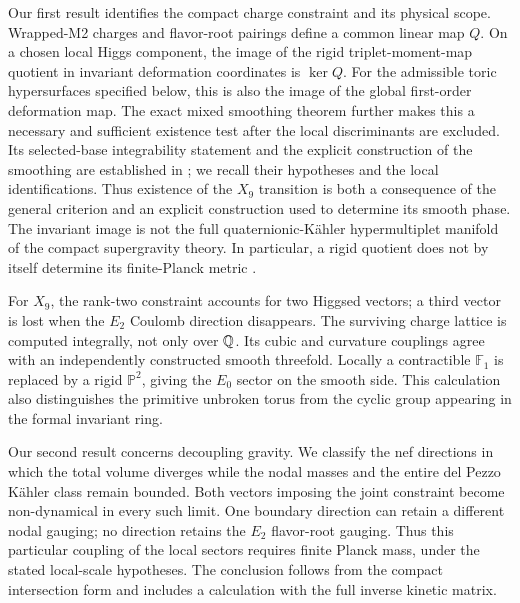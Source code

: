 Our first result identifies the compact charge constraint and
its physical scope. Wrapped-M2 charges and flavor-root
pairings define a common linear map $Q$. On a chosen local
Higgs component, the image of the rigid triplet-moment-map
quotient in invariant deformation coordinates is $\ker Q$.
For the admissible toric hypersurfaces specified below, this
is also the image of the global first-order deformation map.
The exact mixed smoothing theorem further makes this a necessary
and sufficient existence test after the local discriminants are
excluded. Its selected-base integrability statement and the
explicit construction of the smoothing are established in
\cite{Wuebben:2026smoothing}; we recall their hypotheses and the
local identifications. Thus existence of the $X_9$ transition is
both a consequence of the general criterion and an explicit
construction used to determine its smooth phase. The invariant image is not the full
quaternionic-K\"ahler hypermultiplet manifold of the compact
supergravity theory. In particular, a rigid quotient does not
by itself determine its finite-Planck metric
\cite{Mohaupt:2004de}.

For $X_9$, the rank-two constraint accounts for two Higgsed
vectors; a third vector is lost when the $E_2$ Coulomb
direction disappears. The surviving charge lattice is computed
integrally, not only over $\mathbb Q$. Its cubic and curvature
couplings agree with an independently constructed smooth
threefold. Locally a contractible $\mathbb F_1$ is replaced
by a rigid $\mathbb P^2$, giving the $E_0$ sector on the
smooth side. This calculation also distinguishes the primitive
unbroken torus from the cyclic group appearing in the formal
invariant ring.

Our second result concerns decoupling gravity. We classify the
nef directions in which the total volume diverges while the
nodal masses and the entire del Pezzo K\"ahler class remain
bounded. Both vectors imposing the joint constraint become
non-dynamical in every such limit. One boundary direction
can retain a different nodal gauging; no direction retains the
$E_2$ flavor-root gauging. Thus this particular coupling of
the local sectors requires finite Planck mass, under the stated
local-scale hypotheses. The conclusion follows from the
compact intersection form and includes a calculation with
the full inverse kinetic matrix.

